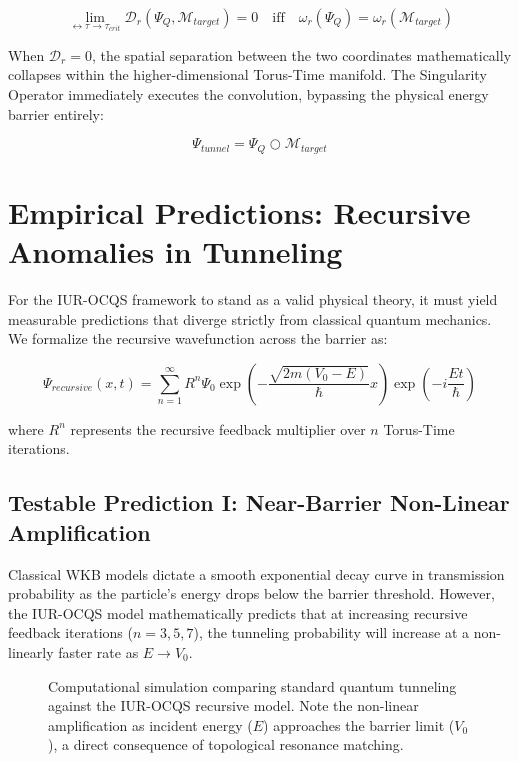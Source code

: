 \documentclass[12pt,openany]{book}
\begin{document}
\begin{equation}
\lim_{\leftrightarrow\tau \to \tau_{crit}} \mathcal{D}_r(\Psi_Q, \mathcal{M}_{target}) = 0 \quad \text{iff} \quad \omega_r(\Psi_Q) = \omega_r(\mathcal{M}_{target})
\end{equation}

When $\mathcal{D}_r = 0$, the spatial separation between the two coordinates mathematically collapses within the higher-dimensional Torus-Time manifold. The Singularity Operator immediately executes the convolution, bypassing the physical energy barrier entirely:

\begin{equation}
\Psi_{tunnel} = \Psi_Q \bigcirc \mathcal{M}_{target}
\end{equation}

\section[Empirical Predictions]{Empirical Predictions: Recursive Anomalies in Tunneling}
For the IUR-OCQS framework to stand as a valid physical theory, it must yield measurable predictions that diverge strictly from classical quantum mechanics. We formalize the recursive wavefunction across the barrier as:

\begin{equation}
\Psi_{recursive}(x,t) = \sum_{n=1}^{\infty} R^n \Psi_0 \exp\left(-\frac{\sqrt{2m(V_0 - E)}}{\hbar}x\right) \exp\left(-i\frac{Et}{\hbar}\right)
\end{equation}

where $R^n$ represents the recursive feedback multiplier over $n$ Torus-Time iterations.

\subsection{Testable Prediction I: Near-Barrier Non-Linear Amplification}
Classical WKB models dictate a smooth exponential decay curve in transmission probability as the particle's energy drops below the barrier threshold. However, the IUR-OCQS model mathematically predicts that at increasing recursive feedback iterations ($n = 3, 5, 7$), the tunneling probability will increase at a non-linearly faster rate as $E \to V_0$.

\begin{figure}[h]
    \centering
    \caption{Computational simulation comparing standard quantum tunneling against the IUR-OCQS recursive model. Note the non-linear amplification as incident energy ($E$) approaches the barrier limit ($V_0$), a direct consequence of topological resonance matching.}
    \label{fig:tunneling_amp}
\end{figure}
\end{document}
